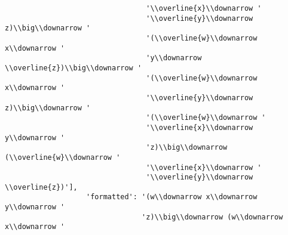 \begin{verbatim}
                                 '\\overline{x}\\downarrow '
                                 '\\overline{y}\\downarrow z)\\big\\downarrow '
                                 '(\\overline{w}\\downarrow x\\downarrow '
                                 'y\\downarrow \\overline{z})\\big\\downarrow '
                                 '(\\overline{w}\\downarrow x\\downarrow '
                                 '\\overline{y}\\downarrow z)\\big\\downarrow '
                                 '(\\overline{w}\\downarrow '
                                 '\\overline{x}\\downarrow y\\downarrow '
                                 'z)\\big\\downarrow (\\overline{w}\\downarrow '
                                 '\\overline{x}\\downarrow '
                                 '\\overline{y}\\downarrow \\overline{z})'],
                   'formatted': '(w\\downarrow x\\downarrow y\\downarrow '
                                'z)\\big\\downarrow (w\\downarrow x\\downarrow '

\end{verbatim}
